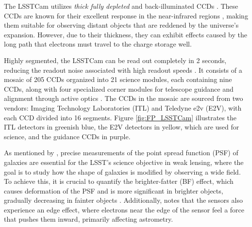 The LSSTCam utilizes \textit{thick fully depleted} and back-illuminated CCDs \citep{2009arXiv0912.0201L}. These CCDs are known for their excellent response in the near-infrared regions \citep{lage2017measurements}, making them suitable for observing distant objects that are reddened by the universe's expansion. However, due to their thickness, they can exhibit effects caused by the long path that electrons must travel to the charge storage well.

\vspace{3mm}
Highly segmented, the LSSTCam can be read out completely in 2 seconds, reducing the readout noise associated with high readout speeds \citep{2009arXiv0912.0201L}. It consists of a mosaic of 205 CCDs organized into 21 science modules, each containing nine CCDs, along with four specialized corner modules for telescope guidance and alignment through active optics \citep{snyder2020laboratory}. The CCDs in the mosaic are sourced from two vendors: Imaging Technology Laboratories (ITL) and Teledyne e2v (E2V), with each CCD divided into 16 segments. Figure \ref{fig:FP_LSSTCam} illustrates the ITL detectors in greenish blue, the E2V detectors in yellow, which are used for science, and the guidance CCDs in purple.

\vspace{3mm}
As mentioned by \cite{walter2015brighter}, precise measurements of the point spread function (PSF) of galaxies are essential for the LSST's science objective in weak lensing, where the goal is to study how the shape of galaxies is modified by observing a wide field. To achieve this, it is crucial to quantify the brighter-fatter (BF) effect, which causes deformation of the PSF and is more significant in brighter objects, gradually decreasing in fainter objects \citep{lage2017measurements}. Additionally, \cite{walter2015brighter} notes that the sensors also experience an edge effect, where electrons near the edge of the sensor feel a force that pushes them inward, primarily affecting astrometry.


